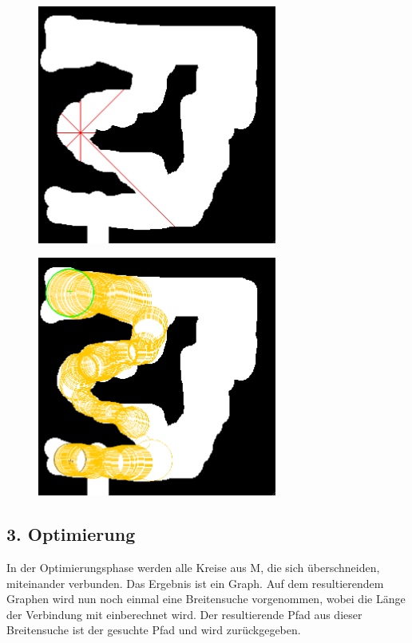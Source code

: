 \begin{figure}[ht]
    \centering
	\includegraphics[width=0.7\textwidth, angle=0]{img/p3.png}
\end{figure}

\begin{figure}[ht]
    \centering
	\includegraphics[width=0.7\textwidth, angle=0]{img/p4.png} 
\end{figure}

\subsection*{3. Optimierung}
	In der Optimierungsphase werden alle Kreise aus M, die sich überschneiden, miteinander verbunden. Das Ergebnis ist ein Graph. Auf dem resultierendem Graphen wird nun noch einmal eine Breitensuche vorgenommen, wobei die Länge der Verbindung mit einberechnet wird. Der resultierende Pfad aus dieser Breitensuche ist der gesuchte Pfad und wird zurückgegeben. \\
	
